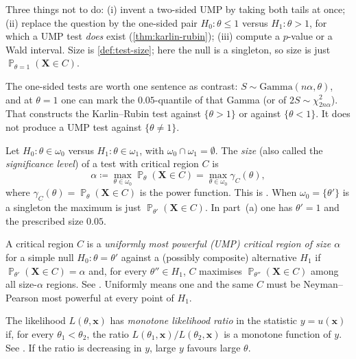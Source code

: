 \documentclass[11pt,a4paper]{article}
\DeclareMathOperator{\Pbb}{\mathbb{P}}
\begin{document}
Three things not to do: (i) invent a two-sided UMP by taking both tails at once; (ii) replace the question by the one-sided pair \( H_0:\theta\le 1 \) versus \( H_1:\theta>1 \), for which a UMP test \emph{does} exist (\cref{thm:karlin-rubin}); (iii) compute a \( p \)-value or a Wald interval. Size is \cref{def:test-size}; here the null is a singleton, so size is just \( \Pbb_{\theta=1}(\mathbf{X}\in C) \).

The one-sided tests are worth one sentence as contrast: \( S\sim\mathrm{Gamma}(n\alpha,\theta) \), and at \( \theta=1 \) one can mark the \( 0.05 \)-quantile of that Gamma (or of \( 2S\sim\chi^{2}_{2n\alpha} \)). That constructs the Karlin--Rubin test against \( \{\theta>1\} \) or against \( \{\theta<1\} \). It does not produce a UMP test against \( \{\theta\neq 1\} \).

\begin{definition}
\label{def:test-size}
Let \( H_0:\theta\in\omega_0 \) versus \( H_1:\theta\in\omega_1 \), with \( \omega_0\cap\omega_1=\emptyset \). The \emph{size} (also called the \emph{significance level}) of a test with critical region \( C \) is
\[
\alpha
\coloneqq
\max_{\theta\in\omega_0}\Pbb_{\theta}(\mathbf{X}\in C)
=
\max_{\theta\in\omega_0}\gamma_C(\theta),
\]
where \( \gamma_C(\theta)=\Pbb_{\theta}(\mathbf{X}\in C) \) is the power function. This is \citep[(8.1.3)]{hogg2019}. When \( \omega_0=\{\theta'\} \) is a singleton the maximum is just \( \Pbb_{\theta'}(\mathbf{X}\in C) \). In part~(a) one has \( \theta'=1 \) and the prescribed size \( 0.05 \).
\end{definition}

\begin{definition}
\label{def:ump-size-alpha}
A critical region \( C \) is a \emph{uniformly most powerful (UMP) critical region of size \( \alpha \)} for a simple null \( H_0:\theta=\theta' \) against a (possibly composite) alternative \( H_1 \) if \( \Pbb_{\theta'}(\mathbf{X}\in C)=\alpha \) and, for every \( \theta''\in H_1 \), \( C \) maximises \( \Pbb_{\theta''}(\mathbf{X}\in C) \) among all size-\( \alpha \) regions. See \citep[Definition~8.2.1]{hogg2019}. Uniformly means one and the same \( C \) must be Neyman--Pearson most powerful at every point of \( H_1 \).
\end{definition}

\begin{definition}
\label{def:mlr}
The likelihood \( L(\theta,\mathbf{x}) \) has \emph{monotone likelihood ratio} in the statistic \( y=u(\mathbf{x}) \) if, for every \( \theta_1<\theta_2 \), the ratio \( L(\theta_1,\mathbf{x})/L(\theta_2,\mathbf{x}) \) is a monotone function of \( y \). See \citep[Definition~8.2.2]{hogg2019}. If the ratio is decreasing in \( y \), large \( y \) favours large \( \theta \).
\end{definition}
\end{document}
